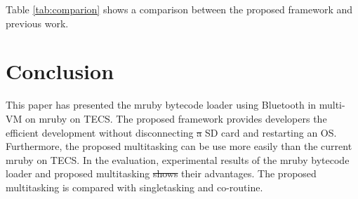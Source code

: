 \documentclass[conference,compsoc]{IEEEtran}
\providecommand{\DIFadd}[1]{{\protect\color{blue}\uwave{#1}}} %
\providecommand{\DIFdel}[1]{{\protect\color{red}\sout{#1}}}                      %
\providecommand{\DIFaddbegin}{} %
\providecommand{\DIFaddend}{} %
\providecommand{\DIFdelbegin}{} %
\providecommand{\DIFdelend}{} %
\begin{document}
Table \ref{tab:comparion} shows a comparison between the proposed framework and previous work.

\section{Conclusion}
\label{sec:Conclusion}
This paper has presented the mruby bytecode loader using Bluetooth in multi-VM on mruby on TECS.
The proposed framework provides developers the efficient development without disconnecting \DIFdelbegin \DIFdel{a }\DIFdelend \DIFaddbegin \DIFadd{an }\DIFaddend SD card and restarting an OS.
Furthermore, the proposed multitasking can be use more easily than the current mruby on TECS.
In the evaluation, experimental results of the mruby bytecode loader and proposed multitasking \DIFdelbegin \DIFdel{shows }\DIFdelend \DIFaddbegin \DIFadd{show }\DIFaddend their advantages.
The proposed multitasking is compared with singletasking and co-routine.



\end{document}
